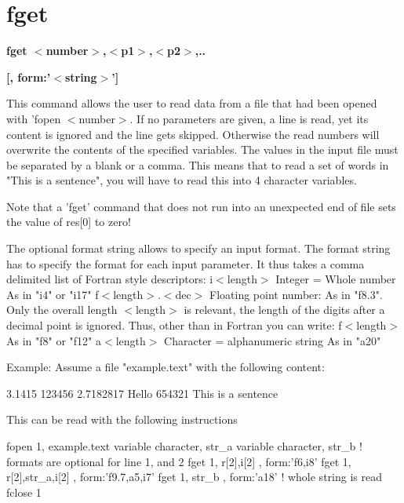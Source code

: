 \section{fget}
{\bf fget $ <$number$> $,$ <$p1$> $,$ <$p2$> $,.. \par }
{\bf               [, form:'$ <$string$> $'] \par }
\par
\vspace{3pt}
This command allows the user to read data from a file that had been 
opened with 'fopen $ <$number$> $. If no parameters are given, a line is 
read, yet its content is ignored and the line gets skipped. 
Otherwise the read numbers will overwrite the contents of the 
specified variables. 
The values in the input file must be separated by a blank or a comma. 
This means that to read a set of words in "This is a sentence", you 
will have to read this into 4 character variables. 
\par
Note that a 'fget' command that does not run into an unexpected 
end of file sets the value of res[0] to zero! 
\par
The optional format string allows to specify an input format. 
The format string has to specify the format for each input parameter. 
It thus takes a comma delimited list of Fortran style descriptors: 
i$ <$length$> $         Integer = Whole number 
                  As in "i4"  or "i17" 
f$ <$length$> $.$ <$dec$> $   Floating point number: 
                  As in "f8.3". Only the overall length $ <$length$> $ 
                                is relevant, the length of the 
                                digits after a decimal point is ignored. 
                                Thus, other than in Fortran you 
                                can write: 
f$ <$length$> $         As in "f8" or "f12" 
a$ <$length$> $         Character = alphanumeric string 
                  As in "a20" 
\par
Example: 
Assume a file "example.text" with the following content: 
\par
3.1415  123456 
2.7182817 Hello 654321 
This is a sentence 
\par
This can be read with the following instructions 
\par
fopen 1, example.text 
variable character, str\_a 
variable character, str\_b ! formats are optional for line 1, and 2 
fget 1, r[2],i[2]         , form:'f6,i8' 
fget 1, r[2],str\_a,i[2]   , form:'f9.7,a5,i7' 
fget 1, str\_b             , form:'a18'        ! whole string is read 
fclose 1 
